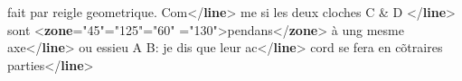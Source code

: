 \begin{shaded}
\hspace*{1em}\hspace*{1em} fait par reigle geometrique. Com{</\textbf{line}>}\mbox{}\newline 
\hspace*{1em}\hspace*{1em}me si les deux cloches C\mbox{}\newline 
\hspace*{1em}\hspace*{1em}\hspace*{1em}\hspace*{1em}\hspace*{1em}\hspace*{1em} \& D {</\textbf{line}>}\mbox{}\newline 
\hspace*{1em}\hspace*{1em} sont {<\textbf{zone}\hspace*{1em}{ulx}="{45}"\hspace*{1em}{uly}="{125}"\hspace*{1em}{lrx}="{60}"\mbox{}\newline 
\hspace*{1em}\hspace*{1em}\hspace*{1em}\hspace*{1em}\hspace*{1em}{lry}="{130}">}pendans{</\textbf{zone}>} à ung mesme axe{</\textbf{line}>}\mbox{}\newline 
\hspace*{1em}\hspace*{1em} ou essieu A B: je dis que\mbox{}\newline 
\hspace*{1em}\hspace*{1em}\hspace*{1em}\hspace*{1em}\hspace*{1em}\hspace*{1em} leur ac{</\textbf{line}>}\mbox{}\newline 
\hspace*{1em}\hspace*{1em}cord se fera en cõtraires parties{</\textbf{line}>}\mbox{}\newline 

\end{shaded}
